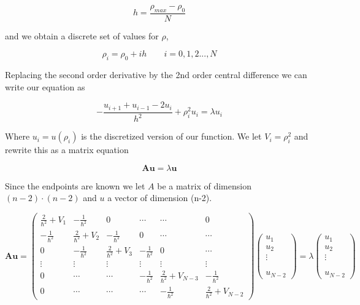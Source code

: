 \documentclass[%
 reprint,
 nobalancelastpage,
 amsmath,amssymb,
 aps,
]{revtex4-1}
\begin{document}
\begin{equation}
	h = \frac{\rho_{max}-\rho_{0}}{N}
\end{equation}

and we obtain a discrete set of values for $\rho$, 

\begin{equation}
	\rho_{i} = \rho_{0} + ih \qquad i=0,1,2...,N
\end{equation}

Replacing the second order derivative by the 2nd order central difference we can write our equation as 

\begin{equation}
	-\frac{u_{i+1}+u_{i-1}-2u_{i}}{h^{2}} + \rho_{i}^{2}u_{i} = \lambda u_{i}
\end{equation}

Where $u_{i} = u(\rho_{i})$ is the discretized version of our function. We let $V_{i} = \rho_{i}^{2}$ and rewrite this as a matrix equation

\begin{equation}
	\bm{Au} = \lambda\bm{u}
\end{equation}

Since the endpoints are known we let $A$ be a matrix of dimension $(n-2)\cdot(n-2)$ and $u$ a vector of dimension (n-2).


\begin{widetext}
\begin{equation}
\bm{Au} =
\begin{pmatrix}
  \frac{2}{\hbar^{2}} + V_{1} & -\frac{1}{\hbar^{2}} & 0 & \cdots & \cdots & 0 \\
  -\frac{1}{\hbar^{2}} & \frac{2}{\hbar^{2}} + V_{2} &  -\frac{1}{\hbar^{2}} & 0 &\cdots & \cdots \\
  0 & -\frac{1}{\hbar^{2}} & \frac{2}{\hbar^{2}} + V_{3} & -\frac{1}{\hbar^{2}} & 0 & \cdots \\
  \vdots & \vdots & \vdots & \vdots & \vdots & \vdots \\
  0 & \cdots & \cdots & -\frac{1}{\hbar^{2}} & \frac{2}{\hbar^{2}} + V_{N-3} & -\frac{1}{\hbar^{2}} \\
  0 & \cdots & \cdots & \cdots & -\frac{1}{\hbar^{2}} & \frac{2}{\hbar^{2}} + V_{N-2}
\end{pmatrix}
\begin{pmatrix}
	u_{1} \\
	u_{2} \\
	\vdots \\
	\\
	\\
	u_{N-2}
\end{pmatrix}
=	\lambda
\begin{pmatrix}
	u_{1} \\
	u_{2} \\
	\vdots \\
	\\
	\\
	u_{N-2}
\end{pmatrix}
\end{equation}
\end{widetext}
\end{document}

